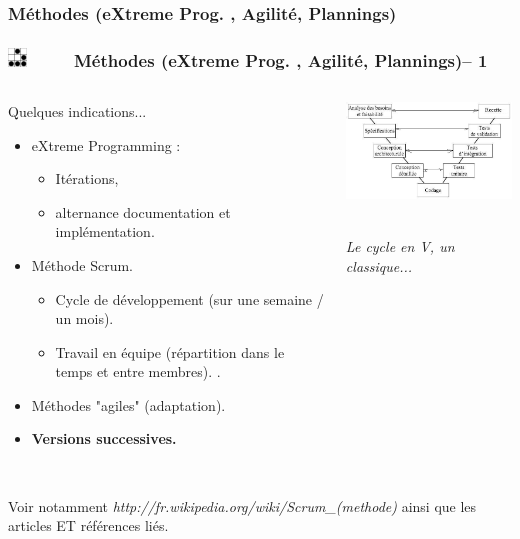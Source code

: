 \documentclass[slidetop,11pt]{beamer}
\def\sectionPartIdDE{M{\'e}thodes (eXtreme Prog. , Agilit{\'e}, Plannings)}
\def\moreInFrameTitle{\includegraphics[height=0.5cm]{img/logo_glider.png}~~~~~}
\begin{document}
\subsubsection{\sectionPartIdDE}
\begin{frame}
	\frametitle{\moreInFrameTitle \sectionPartIdDE  -- 1}
	\begin{columns}[c]
	\begin{column}[c]{6cm}
		 \begin{beamerboxesrounded}	[lower=substructureDE, %
		 				 upper=block title DE,%
						 shadow=true]%
		       {Quelques indications...}
			\begin{itemize}
				\item eXtreme Programming : 
				\begin{itemize}
					\item It{\'e}rations, 
					\item alternance documentation et impl{\'e}mentation. 
				\end{itemize}
				\item M{\'e}thode Scrum. 
				\begin{itemize}
					\item Cycle de d{\'e}veloppement (sur une semaine / un mois). 
					\item Travail en {\'e}quipe (r{\'e}partition dans le temps et entre membres). . 
				\end{itemize}
				\item M{\'e}thodes "agiles" (adaptation). 
				\item \textbf{Versions successives. }
			\end{itemize}
		\end{beamerboxesrounded}
	\end{column}
	\begin{column}[c]{6cm}
		\includegraphics[width=6cm]{img/Cycle_de_developpement_en_v.png}~\\
		\begin{center} \emph{Le cycle en V, un classique...} \end{center}
	\end{column}
	\end{columns}~\\
	Voir notamment \emph{http://fr.wikipedia.org/wiki/Scrum\_(methode)} ainsi que les articles ET r{\'e}f{\'e}rences li{\'e}s. 
\end{frame}
\end{document}
